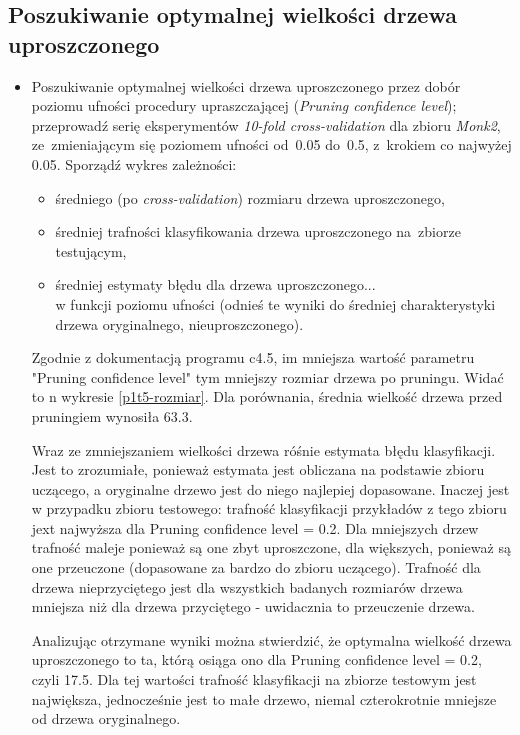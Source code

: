 \subsection{Poszukiwanie optymalnej wielkości drzewa uproszczonego}

\begin{itemize}
\item Poszukiwanie optymalnej wielkości drzewa uproszczonego przez dobór poziomu ufności procedury upraszczającej (\emph{Pruning confidence level}); przeprowadź serię eksperymentów \emph{10-fold cross-validation} dla zbioru \emph{Monk2}, ze~zmieniającym się poziomem ufności od~0.05 do~0.5, z~krokiem co najwyżej 0.05. Sporządź wykres zależności:

\begin{itemize}
	\item średniego (po \emph{cross-validation}) rozmiaru drzewa uproszczonego,  
	\item średniej trafności klasyfikowania drzewa uproszczonego na~zbiorze testującym,
	\item średniej estymaty błędu dla drzewa uproszczonego...
	\\w funkcji poziomu ufności (odnieś te wyniki do średniej charakterystyki drzewa oryginalnego, nieuproszczonego).
\end{itemize}

Zgodnie z dokumentacją programu c4.5, im mniejsza wartość parametru "Pruning confidence level" tym mniejszy rozmiar drzewa po pruningu. Widać to n wykresie \ref{p1t5-rozmiar}. Dla porównania, średnia wielkość drzewa przed pruningiem wynosiła $ 63.3 $.

Wraz ze zmniejszaniem wielkości drzewa róśnie estymata błędu klasyfikacji. Jest to zrozumiałe, ponieważ estymata jest obliczana na podstawie zbioru uczącego, a oryginalne drzewo jest do niego najlepiej dopasowane. Inaczej jest w przypadku zbioru testowego: trafność klasyfikacji przykładów z tego zbioru jext najwyższa dla Pruning confidence level = 0.2. Dla mniejszych drzew trafność maleje ponieważ są one zbyt uproszczone, dla większych, ponieważ są one przeuczone (dopasowane za bardzo do zbioru uczącego). Trafność dla drzewa nieprzyciętego jest dla wszystkich badanych rozmiarów drzewa mniejsza niż dla drzewa przyciętego - uwidacznia to przeuczenie drzewa.

Analizując otrzymane wyniki można stwierdzić, że optymalna wielkość drzewa uproszczonego to ta, którą osiąga ono dla Pruning confidence level = 0.2, czyli 17.5. Dla tej wartości trafność klasyfikacji na zbiorze testowym jest największa, jednocześnie jest to małe drzewo, niemal czterokrotnie mniejsze od drzewa oryginalnego.


\end{itemize}
